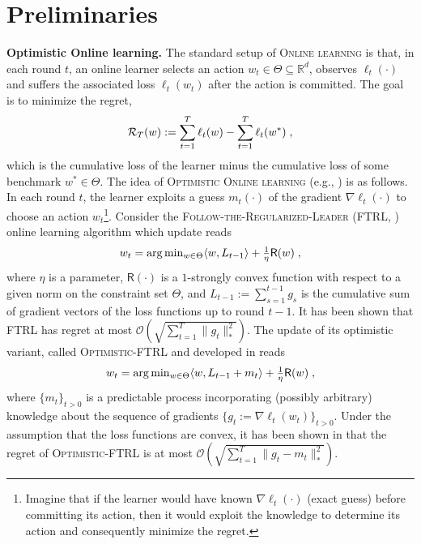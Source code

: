 \documentclass[wcp]{jmlr}
\begin{document}
\section{Preliminaries}\label{sec:prelim}
\vspace{-0.05in}

\textbf{Optimistic Online learning.}\hspace{0.1cm}
The standard setup of \textsc{Online learning} is that, in each round $t$, an online learner selects an action $w_{t} \in \Theta \subseteq \mathbb R^{d}$, observes $\ell_{t}(\cdot)$ and suffers the associated loss $\ell_{t}(w_t)$ after the action is committed.
The goal is to minimize the regret, 
$$\mathcal{R}_{T}( w  ):= \sum_{t=1}^T \ell_{t}(w) - \sum_{t=1}^T \ell_{t}(w^*)\eqsp,$$
which is the cumulative loss of the learner minus the cumulative loss of some benchmark $w^{*} \in \Theta$.
The idea of \textsc{Optimistic Online learning} (e.g., \citep{CJ12,RS13b,SALS15,ALLW18}) is as follows.
In each round $t$, the learner exploits a guess $m_t(\cdot)$ of the gradient $\nabla \ell_t(\cdot)$ to choose an action $w_t$\footnote{Imagine that if the learner would have known $\nabla \ell_t(\cdot)$ (\ie exact guess) before committing its action, then it would exploit the knowledge to determine its action and consequently minimize the regret.}. 
Consider the \textsc{Follow-the-Regularized-Leader} (\textsc{FTRL}, \citep{H14}) online learning algorithm which update reads
\begin{equation} \notag
\textstyle w_t  = \arg \min_{w \in \Theta} \langle w , L_{t-1} \rangle + \frac{1}{\eta} \textsf{R}(w) \eqsp,
\end{equation}
where $\eta$ is a parameter, $\textsf{R}(\cdot)$ is a $1$-strongly convex function with respect to a given norm on the constraint set $\Theta$, and $L_{t-1}:= \sum_{s=1}^{t-1} g_s$ is the cumulative sum of gradient vectors of the loss functions up to round $t-1$. It has been shown that FTRL has regret at most $\mathcal{O}(\sqrt{\sum_{t=1}^T \| g_t \|_*^2})$.
The update of its optimistic variant, called \textsc{Optimistic-FTRL} and developed in \citep{SALS15} reads
\begin{equation} \label{optFTRL}
\textstyle w_t  = \arg \min_{w \in \Theta} \langle w , L_{t-1} + m_t \rangle + \frac{1}{\eta} \textsf{R}(w)\eqsp,
\end{equation}
where $\{m_{t}\}_{t>0}$ is a predictable process incorporating (possibly arbitrary) knowledge about the sequence of gradients $\{ g_{t}:=\nabla \ell_t(w_t)\}_{t>0}$.
Under the assumption that the loss functions are convex, it has been shown in \citep{SALS15} that the regret of \textsc{Optimistic-FTRL} is at most $\mathcal{O}(\sqrt{\sum_{t=1}^T \| g_t - m_t \|_*^2 } )$.
\end{document}
